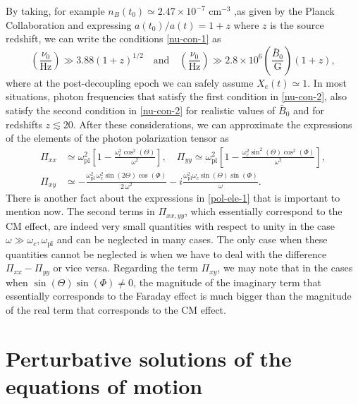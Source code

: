 \documentclass[a4paper,11pt]{article}
\begin{document}
By taking, for example $n_B(t_0)\simeq 2.47\times 10^{-7}$ cm$^{-3}$ ,as given by the Planck Collaboration \cite{Ade:2015xua} and expressing $a(t_0)/a(t)=1+z$ where $z$ is the source redshift, we can write the conditions \eqref{nu-con-1} as
\begin{equation}\label{nu-con-2}
\left(\frac{\nu_0}{\text{Hz}}\right)\gg 3.88 \left(1+z \right)^{1/2} \quad \text{and} \quad \left(\frac{\nu_0}{\text{Hz}}\right)\gg 2.8 \times 10^6 \left(\frac{\bar B_0}{\text{G}}\right) \left( 1+z \right),
\end{equation}
where at the post-decoupling epoch we can safely assume $X_e(t)\simeq 1$. In most situations, photon frequencies that satisfy the first condition in \eqref{nu-con-2}, also satisfy the second condition in \eqref{nu-con-2} for realistic values of $\bar B_0$ and for redshifts $z\lesssim 20$. After these considerations, we can approximate the expressions of the elements of the photon polarization tensor as
\begin{align}\label{pol-ele-1}
\Pi_{xx} & \simeq \omega_\text{pl}^2\left[1 - \frac{\omega_c^2 \cos^2(\Theta)}{\omega^2}\right], \quad \Pi_{yy} \simeq \omega_\text{pl}^2\left[1- \frac{\omega_c^2 \sin^2(\Theta)\cos^2(\Phi)}{\omega^2}\right],\nonumber \\  \Pi_{xy} & \simeq -\frac{\omega_\text{pl}^2\,\omega_c^2 \sin(2 \Theta)\cos(\Phi)}{2\, \omega^2} - i \frac{\omega_\text{pl}^2\omega_c \sin(\Theta)\sin(\Phi)}{\omega}.
\end{align}
There is another fact about the expressions in \eqref{pol-ele-1} that is important to mention now. The second terms in $\Pi_{xx, yy}$, which essentially correspond to the CM effect, are indeed very small quantities with respect to unity in the case $\omega\gg \omega_c, \omega_\text{pl}$ and can be neglected in many cases. The only case when these quantities cannot be neglected is when we have to deal with the difference $\Pi_{xx}-\Pi_{yy}$ or vice versa. Regarding the term $\Pi_{xy}$, we may note that in the cases when $\sin(\Theta)\sin(\Phi)\neq 0$, the magnitude of the imaginary term that essentially corresponds to the Faraday effect is much bigger than the magnitude of the real term that corresponds to the CM effect.







 
 \section{Perturbative solutions of the equations of motion}
 \label{sec:4}
 
\end{document}
